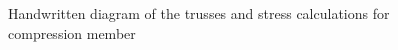 \documentclass[12pt]{article}
\begin{document}
                    \begin{figure}[H]
                        \begin{center}
                        \captionsetup{labelfont=bf}
                        \captionsetup{justification=centering}
                        \begin{minipage}[b]{14pc}
                            \centering
                        \end{minipage}%
                        \begin{minipage}[b]{14pc}{}
                            \centering
                        \end{minipage}\par\medskip
                        \caption{Handwritten diagram of the trusses and stress calculations for compression member}
                        \end{center}
                    \end{figure}
\end{document}
